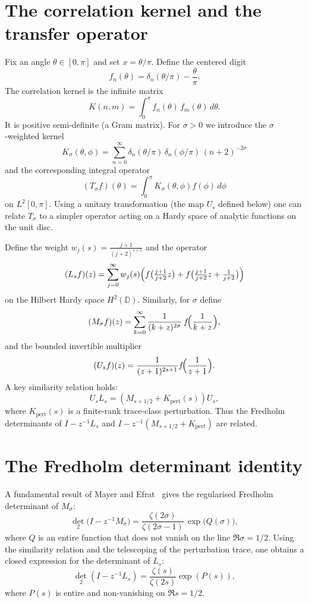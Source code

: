 \documentclass[11pt,a4paper]{article}
\theoremstyle{definition}
\begin{document}
\section{The correlation kernel and the transfer operator}
Fix an angle \(\theta \in [0,\pi]\) and set \(x = \theta/\pi\).
Define the centered digit
\[
f_n(\theta) = \delta_n(\theta/\pi) - \frac{\theta}{\pi}.
\]
The correlation kernel is the infinite matrix
\[
K(n,m) = \int_0^\pi f_n(\theta)\, f_m(\theta)\, d\theta.
\]
It is positive semi‑definite (a Gram matrix).
For \(\sigma > 0\) we introduce the \(\sigma\)‑weighted kernel
\[
K_\sigma(\theta,\phi) = \sum_{n=0}^\infty \delta_n(\theta/\pi)\,\delta_n(\phi/\pi)\, (n+2)^{-2\sigma}
\]
and the corresponding integral operator
\[
(T_\sigma f)(\theta) = \int_0^\pi K_\sigma(\theta,\phi) f(\phi)\, d\phi
\]
on \(L^2[0,\pi]\).
Using a unitary transformation (the map \(U_s\) defined below) one can relate \(T_\sigma\) to a simpler operator acting on a Hardy space of analytic functions on the unit disc.

Define the weight \(w_j(s) = \frac{j+1}{(j+2)^{s+1}}\) and the operator
\[
(L_s f)(z) = \sum_{j=0}^\infty w_j(s)\Bigl( f\bigl(\tfrac{j+1}{j+2}z\bigr) + f\bigl(\tfrac{j+1}{j+2}z + \tfrac{1}{j+2}\bigr) \Bigr)
\]
on the Hilbert Hardy space \(H^2(\mathbb{D})\).
Similarly, for \(\sigma\) define
\[
(M_\sigma f)(z) = \sum_{k=0}^\infty \frac{1}{(k+z)^{2\sigma}} \, f\!\Bigl(\frac{1}{k+z}\Bigr),
\]
and the bounded invertible multiplier
\[
(U_s f)(z) = \frac{1}{(z+1)^{2s+1}} f\!\Bigl(\frac{1}{z+1}\Bigr).
\]
A key similarity relation holds:
\[
U_s L_s = (M_{s+1/2} + K_{\mathrm{pert}}(s)) U_s,
\]
where \(K_{\mathrm{pert}}(s)\) is a finite‑rank trace‑class perturbation.
Thus the Fredholm determinants of \(I - z^{-1}L_s\) and \(I - z^{-1}(M_{s+1/2}+K_{\mathrm{pert}})\) are related.

\section{The Fredholm determinant identity}
A fundamental result of Mayer and Efrat~\cite{Mayer,Efrat} gives the regularised Fredholm determinant of \(M_\sigma\):
\[
{\det}_2\bigl(I - z^{-1} M_\sigma\bigr) =
\frac{\zeta(2\sigma)}{\zeta(2\sigma-1)} \, \exp\bigl(Q(\sigma)\bigr),
\]
where \(Q\) is an entire function that does not vanish on the line \(\Re \sigma = 1/2\).
Using the similarity relation and the telescoping of the perturbation trace, one obtains a closed expression for the determinant of \(L_s\):
\begin{equation}\label{detL}
{\det}_2(I - z^{-1} L_s) = \frac{\zeta(s)}{\zeta(2s)} \exp(P(s)),
\end{equation}
where \(P(s)\) is entire and non‑vanishing on \(\Re s = 1/2\).
\end{document}
